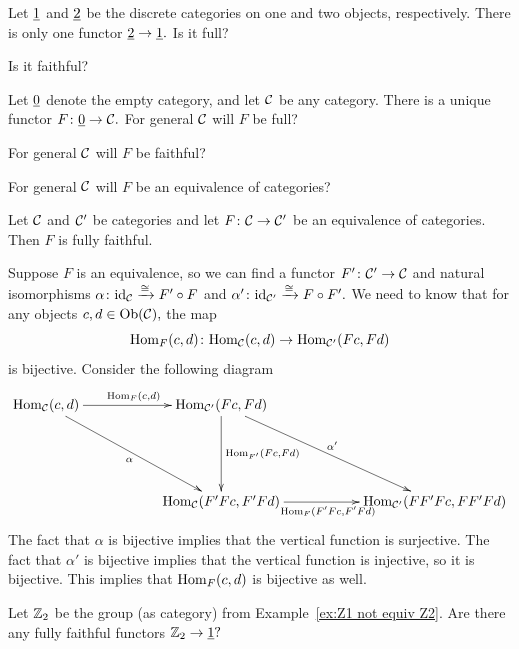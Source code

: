\documentclass[CT4S-EN-RU]{subfiles}
\begin{document}
\begin{definitionRUS}\label{def:full faithful}
\end{definitionRUS}

\begin{exerciseENG}
Let $\underline{1}$ and $\underline{2}$ be the discrete categories on one and two objects, respectively. There is only one functor $\underline{2}\rightarrow\underline{1}.$
\sexc Is it full?
\item Is it faithful?
\endsexc
\end{exerciseENG}

\begin{exerciseRUS}
\end{exerciseRUS}

\begin{exerciseENG}\label{exc:empty fully faithful}
Let $\underline{0}$ denote the empty category, and let $\mathcal{C}$ be any category. There is a unique functor $F\colon \underline{0}\rightarrow\mathcal{C}.$
\sexc For general $\mathcal{C}$ will $F$ be full?
\item For general $\mathcal{C}$ will $F$ be faithful?
\item For general $\mathcal{C}$ will $F$ be an equivalence of categories?
\endsexc
\end{exerciseENG}

\begin{exerciseRUS}\label{exc:empty fully faithful}
\end{exerciseRUS}

\begin{propositionENG}
Let $\mathcal{C}$ and $\mathcal{C}'$ be categories and let $F\colon\mathcal{C}\rightarrow\mathcal{C}'$ be an equivalence of categories. Then $F$ is fully faithful.
\end{propositionENG}

\begin{propositionRUS}
\end{propositionRUS}

\begin{proofENG}
Suppose $F$ is an equivalence, so we can find a functor $F'\colon\mathcal{C}'\rightarrow\mathcal{C}$ and natural isomorphisms $\alpha\colon\textnormal{id}_\mathcal{C}\xrightarrow{\cong}F'\circ F$ and $\alpha'\colon\textnormal{id}_{\mathcal{C}'}\xrightarrow{\cong} F\circ F'.$ We need to know that for any objects $c,d\in\textnormal{Ob}(\mathcal{C}),$ the map $$\textnormal{Hom}_F(c,d)\colon\textnormal{Hom}_\mathcal{C}(c,d)\rightarrow\textnormal{Hom}_{\mathcal{C}'}(Fc,Fd)$$ is bijective. Consider the following diagram 
$$
\xymatrix{
\Hom_\mcC(c,d)\ar[rr]^{\Hom_F(c,d)}\ar[ddrr]_\alpha&&\Hom_{\mcC'}(Fc,Fd)\ar[ddrr]^{\alpha'}\ar[dd]^{\Hom_{F'}(Fc,Fd)}\\\\
&&\Hom_\mcC(F'Fc,F'Fd)\ar[rr]_{\Hom_{F}(F'Fc,F'Fd)}&&\Hom_{\mcC'}(FF'Fc,FF'Fd)
}
$$
The fact that $\alpha$ is bijective implies that the vertical function is surjective. The fact that $\alpha'$ is bijective implies that the vertical function is injective, so it is bijective. This implies that $\textnormal{Hom}_F(c,d)$ is bijective as well.
\end{proofENG}

\begin{proofRUS}
\end{proofRUS}

\begin{exerciseENG}
Let ${\mathbb Z}_2$ be the group (as category) from Example~\ref{ex:Z1 not equiv Z2}. Are there any fully faithful functors ${\mathbb Z}_2\rightarrow\underline{1}?$
\end{exerciseENG}

\begin{exerciseRUS}
\end{exerciseRUS}
\end{document}
